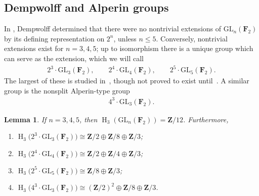 \documentclass[pdftex]{sigma}
\numberwithin{equation}{section}
\newtheorem{Lemma}[Theorem]{Lemma}
\newcommand\bF{\mathbf F}
\newcommand\bZ{\mathbf Z}
\DeclareMathOperator\homology{H}
\renewcommand\H{\homology}
\newcommand\<\langle
\renewcommand\>\rangle
\newcommand{\GL}{\mathrm{GL}}
\begin{document}
\subsection{Dempwolff and Alperin groups}

In \cite{MR0357639}, Dempwolff determined that there were no nontrivial extensions of $\GL_n(\bF_2)$ by its defining representation on $2^n$, unless $n \leq 5$. Conversely, nontrivial extensions exist for $n = 3,4,5$; up to isomorphism there is a unique group which can serve as the extension, which we will call
\begin{gather*}
2^3 \cdot \GL_3(\bF_2), \qquad 2^4 \cdot \GL_4(\bF_2), \qquad 2^5 \cdot \GL_5(\bF_2).
\end{gather*}
The largest of these is studied in~\cite{MR0393276}, {though not proved to exist until~\cite{MR0409630,MR0399193}}. A similar group is the nonsplit Alperin-type group
\begin{gather*}
4^3 \cdot \GL_3(\bF_2).
\end{gather*}

\begin{Lemma}\label{lemma:Dempwolff} If $n = 3,4,5$, then $\H_3(\GL_n(\bF_2)) = \bZ/12$. Furthermore,
\begin{enumerate}\itemsep=0pt
\item[$1)$] $\H_3\big(2^3 \cdot \GL_3(\bF_2)\big) \cong \bZ/2 \oplus \bZ/8 \oplus \bZ/3$; %
\item[$2)$] $\H_3\big(2^4 \cdot \GL_4(\bF_2)\big) \cong \bZ/2 \oplus \bZ/4 \oplus \bZ/3$; %
\item[$3)$] $\H_3\big(2^5 \cdot \GL_5(\bF_2)\big) \cong \bZ/8 \oplus \bZ/3$; %
\item[$4)$] $\H_3\big(4^3 \cdot \GL_3(\bF_2)\big) \cong (\bZ/2)^2 \oplus \bZ/8 \oplus \bZ/3$. %
\end{enumerate}
\end{Lemma}
\end{document}
